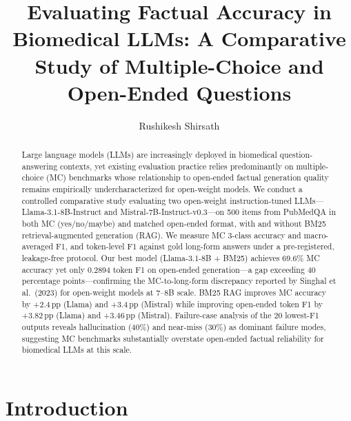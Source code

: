\documentclass[sigconf, nonacm]{acmart}
\begin{document}
\title{Evaluating Factual Accuracy in Biomedical LLMs: A Comparative Study of Multiple-Choice and Open-Ended Questions}

\author{Rushikesh Shirsath}

\begin{abstract}
Large language models (LLMs) are increasingly deployed in biomedical
question-answering contexts, yet existing evaluation practice relies
predominantly on multiple-choice (MC) benchmarks whose relationship to
open-ended factual generation quality remains empirically undercharacterized
for open-weight models. We conduct a controlled comparative study evaluating
two open-weight instruction-tuned LLMs---Llama-3.1-8B-Instruct and
Mistral-7B-Instruct-v0.3---on 500 items from PubMedQA in both MC (yes/no/maybe)
and matched open-ended format, with and without BM25 retrieval-augmented
generation (RAG). We measure MC 3-class accuracy and macro-averaged F1,
and token-level F1 against gold long-form answers under a pre-registered,
leakage-free protocol. Our best model (Llama-3.1-8B + BM25) achieves
69.6\% MC accuracy yet only 0.2894 token F1 on open-ended generation---a gap
exceeding 40 percentage points---confirming the MC-to-long-form discrepancy
reported by Singhal et al.\ (2023) for open-weight models at 7--8B scale.
BM25 RAG improves MC accuracy by +2.4\,pp (Llama) and +3.4\,pp (Mistral)
while improving open-ended token F1 by +3.82\,pp (Llama) and +3.46\,pp (Mistral).
Failure-case analysis of the 20 lowest-F1 outputs reveals hallucination (40\%) and
near-miss (30\%) as dominant failure modes, suggesting MC benchmarks substantially
overstate open-ended factual reliability for biomedical LLMs at this scale.
\end{abstract}


\maketitle

\section{Introduction}
\end{document}
